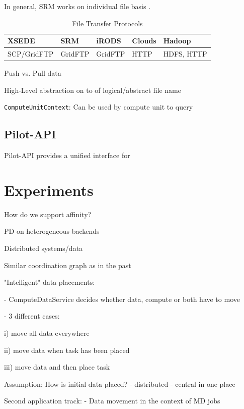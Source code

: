 \documentclass[conference]{IEEEtran}
\begin{document}
In general, SRM works on individual file basis .


\begin{table}[ht]
\begin{tabular}{|p{1cm}|p{1cm}|p{1cm}|p{1cm}|p{1cm}|}
		\hline
		\textbf{XSEDE} &\textbf{SRM} &\textbf{iRODS} &\textbf{Clouds} &\textbf{Hadoop}\\
		\hline
		SCP/GridFTP &GridFTP &GridFTP &HTTP &HDFS, HTTP\\
		\hline
\end{tabular}
\caption{File Transfer Protocols}
\end{table}


Push vs. Pull data

High-Level abstraction on to of logical/abstract file name 



\texttt{ComputeUnitContext}: Can be used by compute unit to query 


\subsection{Pilot-API}
Pilot-API provides a unified interface for 







\section{Experiments}

How do we support affinity?

PD on heterogeneous backends

Distributed systems/data

Similar coordination graph as in the past

"Intelligent" data placements:

- ComputeDataService decides whether data, compute or both have to move

- 3 different cases:

i) move all data everywhere

ii) move data when task has been placed

iii) move data and then place task

Assumption:
How is initial data placed?
- distributed
- central in one place

Second application track:
- Data movement in the context of MD jobs
\end{document}
